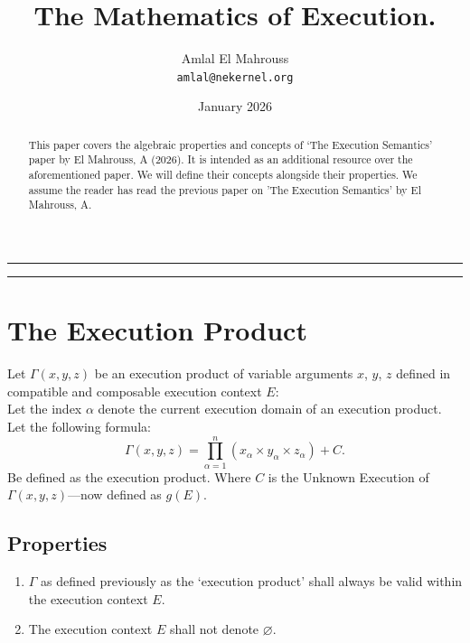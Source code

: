 \documentclass[11pt,a4paper]{article}
\title{The Mathematics of Execution.}
\author{Amlal El Mahrouss\\
\texttt{amlal@nekernel.org}}
\date{January 2026}
\begin{document}
\bf \maketitle

\begin{center}
	\rule[0.01cm]{17cm}{0.01cm}
\end{center}

\begin{center}
\begin{abstract}
This paper covers the algebraic properties and concepts of `The Execution Semantics' paper by El Mahrouss, A (2026). It is intended as an additional resource over the aforementioned paper.
We will define their concepts alongside their properties. We assume the reader has read the previous paper on 'The Execution Semantics' by El Mahrouss, A.
\end{abstract}
\end{center}

\begin{center}
	\rule[1cm]{17cm}{0.01cm}
\end{center}

\section{The Execution Product}

Let $\Gamma(x, y, z)$ be an execution product of variable arguments $x$, $y$, $z$ defined in compatible and composable execution context $E$: \\
Let the index $\alpha$ denote the current execution domain of an execution product.
Let the following formula:
\begin{equation}
\Gamma(x, y, z) = \prod_{\alpha=1}^{n}(x_{\alpha} \times y_{\alpha} \times z_{\alpha})+C.    
\end{equation}
 Be defined as the execution product. Where $C$ is the Unknown Execution of $\Gamma(x, y, z)$—now defined as $g(E)$.

\subsection{Properties}

\begin{enumerate}

    \item $\Gamma$ as defined previously as the `execution product' shall always be valid within the execution context $E$.
    \item The execution context $E$ shall not denote $\varnothing$.

\end{enumerate}
\end{document}
